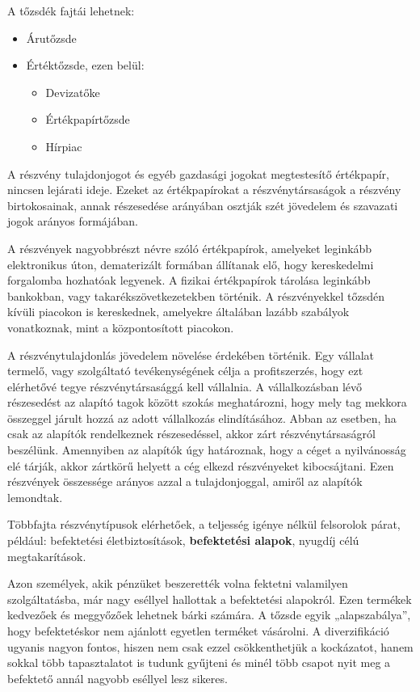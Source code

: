 A tőzsdék fajtái lehetnek: 

\begin{itemize}
\item Árutőzsde
\item Értéktőzsde, ezen belül: 
	\begin{itemize}
	     \item Devizatőke
	     \item Értékpapírtőzsde 
	     \item Hírpiac
	\end{itemize}
\end{itemize}


A részvény tulajdonjogot és egyéb gazdasági jogokat megtestesítő értékpapír, nincsen lejárati ideje. Ezeket az értékpapírokat a részvénytársaságok a részvény birtokosainak, annak részesedése arányában osztják szét jövedelem és szavazati jogok arányos formájában.

	A részvények nagyobbrészt névre szóló értékpapírok, amelyeket leginkább elektronikus úton, dematerizált formában állítanak elő, hogy kereskedelmi forgalomba hozhatóak legyenek. A fizikai értékpapírok tárolása leginkább bankokban, vagy takarékszövetkezetekben történik. A részvényekkel tőzsdén kívüli piacokon is kereskednek, amelyekre általában lazább szabályok vonatkoznak, mint a központosított piacokon. 

	A részvénytulajdonlás jövedelem növelése érdekében történik. Egy vállalat termelő, vagy szolgáltató tevékenységének célja a profitszerzés, hogy ezt elérhetővé tegye részvénytársasággá kell vállalnia. A vállalkozásban lévő részesedést az alapító tagok között szokás meghatározni, hogy mely tag mekkora összeggel járult hozzá az adott vállalkozás elindításához. Abban az esetben, ha csak az alapítók rendelkeznek részesedéssel, akkor zárt részvénytársaságról beszélünk. Amennyiben az alapítók úgy határoznak, hogy a céget a nyilvánosság elé tárják, akkor zártkörű helyett a cég elkezd részvényeket kibocsájtani. Ezen részvények összessége arányos azzal a tulajdonjoggal, amiről az alapítók lemondtak.

	Többfajta részvénytípusok elérhetőek, a teljesség igénye nélkül felsorolok párat, például: befektetési életbiztosítások, \textbf{befektetési alapok}, nyugdíj célú megtakarítások.  \cite{wikiShare}


Azon személyek, akik pénzüket beszerették volna fektetni valamilyen szolgáltatásba, már nagy eséllyel hallottak a befektetési alapokról. Ezen termékek kedvezőek és meggyőzőek lehetnek bárki számára. A tőzsde egyik „alapszabálya”, hogy befektetéskor nem ajánlott egyetlen terméket vásárolni. A diverzifikáció ugyanis nagyon fontos, hiszen nem csak ezzel csökkenthetjük a kockázatot, hanem sokkal több tapasztalatot is tudunk gyűjteni és minél több csapot nyit meg a befektető annál nagyobb eséllyel lesz sikeres. \cite{wikiInvest}

